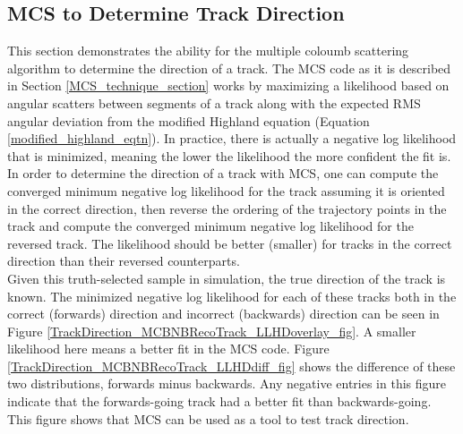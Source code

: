 \subsection{MCS to Determine Track Direction}\label{TrackDirection_MCBNBRecoTrack_section}
This section demonstrates the ability for the multiple coloumb scattering algorithm to determine the direction of a track. The MCS code as it is described in Section \ref{MCS_technique_section} works by maximizing a likelihood based on angular scatters between segments of a track along with the expected RMS angular deviation from the modified Highland equation (Equation \ref{modified_highland_eqtn}). In practice, there is actually a negative log likelihood that is minimized, meaning the lower the likelihood the more confident the fit is. In order to determine the direction of a track with MCS, one can compute the converged minimum negative log likelihood for the track assuming it is oriented in the correct direction, then reverse the ordering of the trajectory points in the track and compute the converged minimum negative log likelihood for the reversed track. The likelihood should be better (smaller) for tracks in the correct direction than their reversed counterparts.\\

Given this truth-selected sample in simulation, the true direction of the track is known. The minimized negative log likelihood for each of these tracks both in the correct (forwards) direction and incorrect (backwards) direction can be seen in Figure \ref{TrackDirection_MCBNBRecoTrack_LLHDoverlay_fig}. A smaller likelihood here means a better fit in the MCS code. Figure \ref{TrackDirection_MCBNBRecoTrack_LLHDdiff_fig} shows the difference of these two distributions, forwards minus backwards. Any negative entries in this figure indicate that the forwards-going track had a better fit than backwards-going. This figure shows that MCS can be used as a tool to test track direction.


